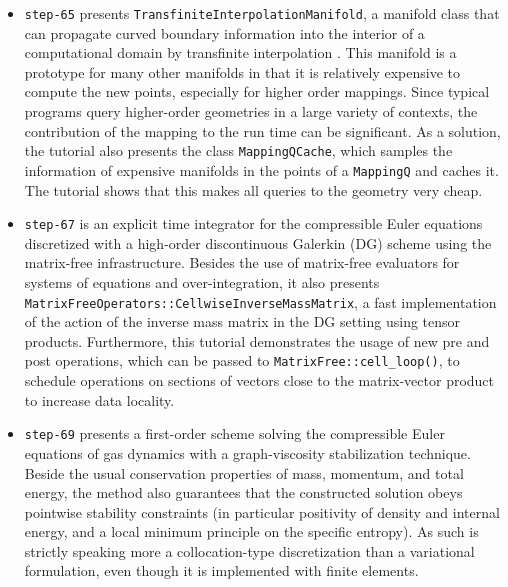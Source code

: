 \documentclass{ansarticle-preprint}
\begin{document}
\begin{itemize}
  \item \texttt{step-65} presents \texttt{TransfiniteInterpolationManifold}, a
        manifold class that can propagate curved boundary information into the
        interior of a computational domain by transfinite interpolation \cite{Gordon82}.
        This manifold is a prototype for many other manifolds in that it is relatively
        expensive to compute the new points, especially for higher order mappings. Since
        typical programs query higher-order geometries in a large variety of contexts,
        the contribution of the mapping to the run time can be significant. As a
        solution, the tutorial also presents the class \texttt{MappingQCache}, which
        samples the information of expensive manifolds in the points of a
        \texttt{MappingQ} and caches it. The tutorial shows that this makes all queries
        to the geometry very cheap.

  \item \texttt{step-67} is an explicit time integrator for the
        compressible Euler equations discretized with a high-order discontinuous
        Galerkin (DG) scheme using the matrix-free infrastructure. Besides the use of
        matrix-free evaluators for systems of equations and over-integration, it also
        presents \texttt{MatrixFreeOperators::CellwiseInverseMassMatrix}, a fast implementation
        of the action of the inverse mass matrix in the DG setting using tensor
        products. Furthermore, this tutorial demonstrates the usage of new
        pre and post operations, which can be passed to
        \texttt{MatrixFree::cell\_loop()}, to schedule operations on sections of vectors close
        to the matrix-vector product to increase data locality.

  \item \texttt{step-69} presents a first-order scheme solving the compressible
        Euler equations of gas dynamics with a graph-viscosity stabilization
        technique. Beside the usual conservation properties of mass, momentum, and
        total energy, the method also guarantees that the constructed solution
        obeys pointwise stability constraints (in particular positivity of
        density and internal
        energy, and a local minimum principle on the specific entropy). As such
         is strictly speaking more a collocation-type discretization
        than a variational formulation, even though it is implemented with finite
        elements.


\end{itemize}
\end{document}
